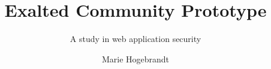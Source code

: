 \documentclass[a4paper,project,final]{miunthes} %
\title{Exalted Community Prototype}
\subtitle{A study in web application security}
\author{Marie Hogebrandt}
\begin{document}
	\begin{titlingpage}
		\maketitle
	\end{titlingpage}
	\frontmatter
	
	\cleardoublepage
	
	\cleardoublepage
	\tableofcontents
	\cleardoublepage
	\printnomenclature

	\mainmatter
	
	
	
	

  \printbibliography

	\appendix
	
	\backmatter
\end{document}
